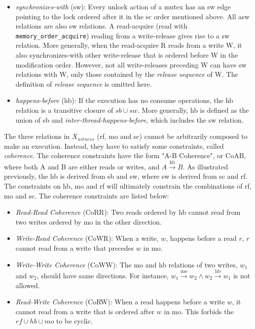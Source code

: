 \begin{itemize}
	\item \textit{synchronizes-with} (sw): Every unlock action of a mutex has an sw edge pointing to the lock ordered after it in the sc order mentioned above. All asw relations are also sw relations. A read-acquire (read with \texttt{memory\_order\_acquire}) reading from a write-release gives rise to a sw relation. More generally, when the read-acquire R reads from a write W, it also synchronizes-with other write-release that is ordered before W in the modification order. However, not all write-releases preceding W can have sw relations with W, only those contained by the \textit{release sequence} of W. The definition of \textit{release sequence} is omitted here.
	\item \textit{happens-before} (hb): If the execution has no consume operations, the hb relation is a transitive closure of $sb \cup sw$. More generally, hb is defined as the union of sb and \textit{inter-thread-happens-before}, which includes the sw relation.
\end{itemize}

The three relations in $X_{witness}$ (rf, mo and sc) cannot be arbitrarily composed to make an execution. Instead, they have to satisfy some constraints, called \textit{coherence}. The coherence constraints have the form "A-B Coherence", or CoAB, where both A and B are either reads or writes, and $A \xrightarrow{\text{hb}} B$. As illustrated previously, the hb is derived from sb and sw, where sw is derived from sc and rf. The constraints on hb, mo and rf will ultimately constrain the combinations of rf, mo and sc. The coherence constraints are listed below:

\begin{itemize}
	\item \textit{Read-Read Coherence} (CoRR): Two reads ordered by hb cannot read from two writes ordered by mo in the other direction.
	\item \textit{Write-Read Coherence} (CoWR): When a write, $w$, happens before a read $r$, $r$ cannot read from a write that precedes $w$ in mo.
	\item \textit{Write-Write Coherence} (CoWW): The mo and hb relations of two writes, $w_1$ and $w_2$, should have same directions. For instance, $w_1 \xrightarrow{\text{mo}} w_2 \land w_2 \xrightarrow{\text{hb}} w_1$ is not allowed.
	\item \textit{Read-Write Coherence} (CoRW): When a read happens before a write $w$, it cannot read from a write that is ordered after $w$ in mo. This forbids the $rf \cup hb \cup mo$ to be cyclic.
\end{itemize}



